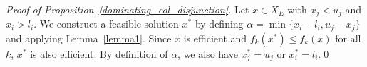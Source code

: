 \documentclass[11.5pt]{article}
\begin{document}
\begin{proof}[Proof of Proposition~\ref{dominating_col_disjunction}] 
Let $x\in X_{E}$ with $x_j < u_j$ and $x_i > l_i$. We construct a feasible solution $x^*$ by defining $\alpha = \min\{ x_i - l_i, u_j - x_j \}$ and applying Lemma~\ref{lemma1}. Since $x$ is efficient and $f_k(x^*) \leq f_k(x)$ for all $k$, $x^*$ is also efficient. By definition of $\alpha$, we also have $x^*_j = u_j$ or $x_i^* = l_i$.\qed
\end{proof}
\end{document}
